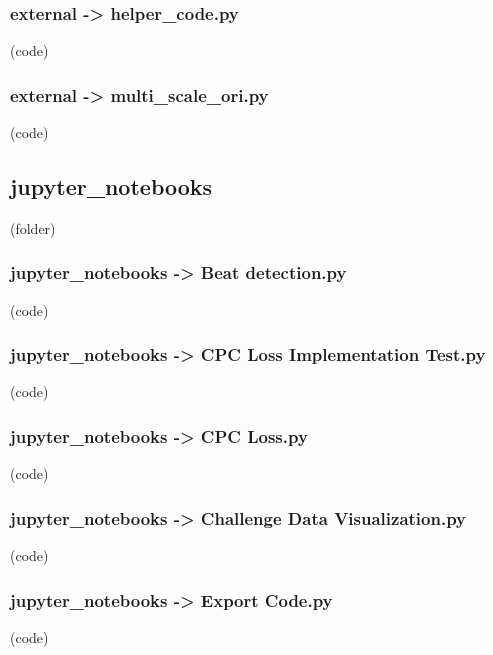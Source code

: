 \begin{myparindent}{0pt}
\noindent\subsubsection[helper\_code.py]{external -> helper\_code.py} (code)

\noindent\subsubsection[multi\_scale\_ori.py]{external -> multi\_scale\_ori.py} (code)

\noindent\subsection[jupyter\_notebooks]{jupyter\_notebooks} (folder)
\noindent\subsubsection[Beat detection.py]{jupyter\_notebooks -> Beat detection.py} (code)

\noindent\subsubsection[CPC Loss Implementation Test.py]{jupyter\_notebooks -> CPC Loss Implementation Test.py} (code)

\noindent\subsubsection[CPC Loss.py]{jupyter\_notebooks -> CPC Loss.py} (code)

\noindent\subsubsection[Challenge Data Visualization.py]{jupyter\_notebooks -> Challenge Data Visualization.py} (code)

\noindent\subsubsection[Export Code.py]{jupyter\_notebooks -> Export Code.py} (code)

\end{myparindent}
